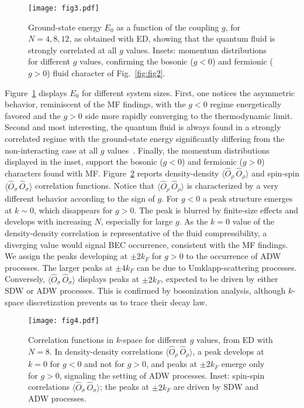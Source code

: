 \documentclass[pra,aps,superscriptaddress,twocolumn]{revtex4}
\begin{document}
\begin{figure}[!t]
  \texttt{[image: fig3.pdf]}
  \caption{Ground-state energy $E_0$ as a function of the coupling $g$,
      for $N=4, 8, 12$, as obtained with ED,
    showing that the quantum fluid is strongly correlated at all $g$ values.
    Insets: momentum distributions for different $g$ values, confirming the bosonic ($g<0$)
    and fermionic ($g>0$) fluid character of Fig.~\ref{fig:fig2}.}
  \label{fig:fig3}
\end{figure}
Figure~\ref{fig:fig3} displays $E_0$ for different system sizes.
First, one notices the asymmetric behavior, reminiscent of the MF findings,
with the $g<0$ regime energetically favored and the $g>0$ side more rapidly converging to the thermodynamic limit.
Second and most interesting, the quantum fluid is always found in a strongly correlated regime with the ground-state
energy significantly differing from the non-interacting case at all
$g$ values~\cite{Giamarchi}. Finally, the momentum distributions displayed
in the inset, support the bosonic ($g<0$) and fermionic ($g>0$) characters found with MF.
%
Figure~\ref{fig:fig4} reports density-density $\langle \hat O_\rho \, \hat O_\rho\rangle$
and spin-spin $\langle \hat O_\sigma \, \hat O_\sigma\rangle$ correlation functions.
Notice that $\langle \hat O_\rho \, \hat O_\rho\rangle$ is characterized by a very different behavior
according to the sign of $g$. For $g<0$ a peak structure emerges at $k\sim 0$, which disappears for $g>0$.
The peak is blurred by finite-size effects and develops with increasing $N$, especially for large $g$.
As the $k=0$ value of the density-density correlation is representative of the fluid compressibility,
a diverging value would signal BEC occurrence, consistent with the MF findings.
We assign the peaks developing at $\pm 2k_F$ for $g>0$ to the occurrence of ADW processes.
The larger peaks at $\pm 4k_F$ can be due to Umklapp-scattering processes.
Conversely, $\langle \hat O_\sigma \, \hat O_\sigma\rangle$ displays peaks at $\pm 2k_F$,
expected to be driven by either SDW or ADW processes.
This is confirmed by bosonization analysis, although $k$-space discretization prevents us
to trace their decay law.

\begin{figure}[!t]
  \texttt{[image: fig4.pdf]}
  \caption{Correlation functions in $k$-space for different $g$ values, from ED with $N=8$.
    In density-density correlations $\langle \hat O_\rho \, \hat O_\rho \rangle$, a peak develops at $k=0$
    for $g<0$ and not for $g>0$, and peaks at $\pm 2k_F$ emerge only for $g>0$, signaling the setting of ADW processes.
    Inset: spin-spin correlations $\langle \hat O_\sigma \,\hat O_\sigma \rangle$; the peaks at $\pm 2k_F$ are
    driven by SDW and ADW processes.}
  \label{fig:fig4}
\end{figure}
\end{document}
